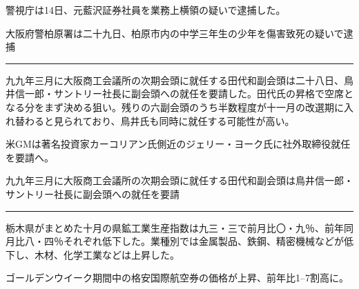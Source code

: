 \documentclass[japanese]{jnlp_1.4}
\begin{document}

\begin{InL}
警視庁は14日、元藍沢証券社員を業務上横領の疑いで逮捕した。
\end{InL}


\begin{InL}
大阪府警柏原署は二十九日、柏原市内の中学三年生の少年を傷害致死の疑いで逮捕
\end{InL}

\vspace{0.5\baselineskip}
\hrule
\vspace{0.5\baselineskip}


\begin{InL}
九九年三月に大阪商工会議所の次期会頭に就任する田代和副会頭は二十八日、鳥井信一郎・サントリー社長に副会頭への就任を要請した。田代氏の昇格で空席となる分をまず決める狙い。残りの六副会頭のうち半数程度が十一月の改選期に入れ替わると見られており、鳥井氏も同時に就任する可能性が高い。
\end{InL}


\begin{InL}
米GMは著名投資家カーコリアン氏側近のジェリー・ヨーク氏に社外取締役就任を要請へ。
\end{InL}


\begin{InL}
九九年三月に大阪商工会議所の次期会頭に就任する田代和副会頭は鳥井信一郎・サントリー社長に副会頭への就任を要請
\end{InL}

\vspace{0.5\baselineskip}
\hrule
\vspace{0.5\baselineskip}


\begin{InL}
栃木県がまとめた十月の県鉱工業生産指数は九三・三で前月比〇・九％、前年同月比八・四％それぞれ低下した。業種別では金属製品、鉄鋼、精密機械などが低下し、木材、化学工業などは上昇した。
\end{InL}


\begin{InL}
ゴールデンウイーク期間中の格安国際航空券の価格が上昇、前年比1--7割高に。
\end{InL}
\end{document}
